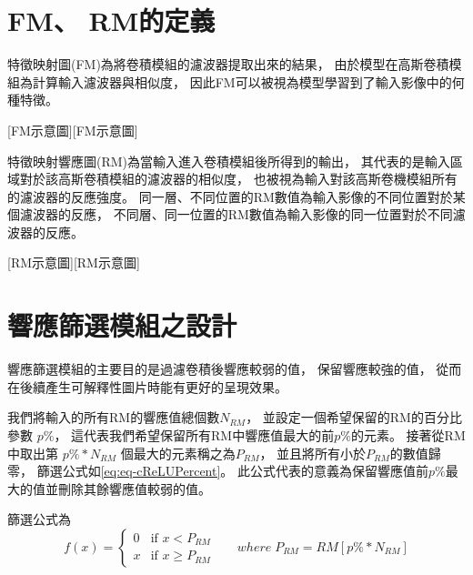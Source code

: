 \documentclass[class=NCU_thesis, crop=false]{standalone}
\begin{document}
\section{FM、 RM的定義}
	特徵映射圖(FM)為將卷積模組的濾波器提取出來的結果，
	由於模型在高斯卷積模組為計算輸入濾波器與相似度，
	因此FM可以被視為模型學習到了輸入影像中的何種特徵。

	[FM示意圖][FM示意圖]

	特徵映射響應圖(RM)為當輸入進入卷積模組後所得到的輸出，
	其代表的是輸入區域對於該高斯卷積模組的濾波器的相似度，
	也被視為輸入對該高斯卷機模組所有的濾波器的反應強度。
	同一層、不同位置的RM數值為輸入影像的不同位置對於某個濾波器的反應，
	不同層、同一位置的RM數值為輸入影像的同一位置對於不同濾波器的反應。

	[RM示意圖][RM示意圖]

\pagebreak

\section{響應篩選模組之設計}
	

	
	響應篩選模組的主要目的是過濾卷積後響應較弱的值，
	保留響應較強的值，
	從而在後續產生可解釋性圖片時能有更好的呈現效果。

	我們將輸入的所有RM的響應值總個數$N_{RM}$，
	並設定一個希望保留的RM的百分比參數 $p\%$，
	這代表我們希望保留所有RM中響應值最大的前$p\%$的元素。
	接著從RM中取出第 $p\% * N_{RM}$  個最大的元素稱之為$P_{RM}$，
	並且將所有小於$P_{RM}$的數值歸零，
	篩選公式如\cref{eq:eq-cReLUPercent}。
	此公式代表的意義為保留響應值前$p\%$最大的值並刪除其餘響應值較弱的值。
	
	篩選公式為\\
	\begin{equation}
	    \label{eq:eq-cReLUPercent}
	    f(x)= 
	    \begin{cases}
	        0 & \text{if  $x < P_{RM}$ }\\
	        x & \text{if  $x \geq P_{RM}$}
	    \end{cases} \quad where \; P_{RM} = RM\left[ p\% * N_{RM} \right]
	\end{equation}
\pagebreak
\end{document}
